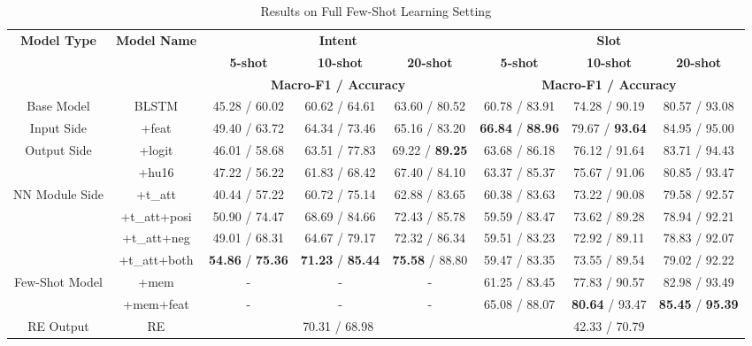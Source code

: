 \begin{table*}
{\begin{tabular}{|c|c|c|c|c|c|c|c|}
\hline
\multirow{3}{*}{\textbf{Model Type}} & \multirow{3}{*}{\textbf{Model Name}}  & \multicolumn{3}{|c|}{\textbf{Intent}} & \multicolumn{3}{|c|}{\textbf{Slot}} \\
\cline{3-8}
&  & \multicolumn{1}{|c|}{\textbf{5-shot}} & \multicolumn{1}{|c|}{\textbf{10-shot}} & \multicolumn{1}{|c|}{\textbf{20-shot}} 
& \multicolumn{1}{|c|}{\textbf{5-shot}} & \multicolumn{1}{|c|}{\textbf{10-shot}} & \multicolumn{1}{|c|}{\textbf{20-shot}}  \\
\cline{3-8}
&  & \multicolumn{3}{|c|}{\textbf{Macro-F1 / Accuracy}} & \multicolumn{3}{|c|}{\textbf{Macro-F1 / Accuracy}} \\
\hline
Base Model & BLSTM & 45.28 / 60.02 & 60.62 / 64.61 & 63.60 / 80.52 
& 60.78 / 83.91 & 74.28  / 90.19 & 80.57 / 93.08  \\
\hline
Input Side & +feat & 49.40 / 63.72 & 64.34 / 73.46 & 65.16 / 83.20 
& \textbf{66.84} / \textbf{88.96} & 79.67 / \textbf{93.64} & 84.95 / 95.00  \\
\hline
\multirow{2}{*}{Output Side} & +logit & 46.01 / 58.68 & 63.51 / 77.83 & 69.22 / \textbf{89.25} 
& 63.68 / 86.18 & 76.12 / 91.64  & 83.71 / 94.43 \\
\cline{2-8}
& +hu16 & 47.22 / 56.22 & 61.83 / 68.42 & 67.40 / 84.10 
& 63.37 / 85.37 & 75.67 / 91.06 & 80.85 / 93.47  \\
\hline
\multirow{2}{*}{\vspace{-2.2em}NN Module Side} & +t\_att & 40.44 / 57.22 & 60.72 / 75.14 & 62.88 / 83.65
& 60.38 / 83.63 & 73.22 / 90.08 & 79.58 / 92.57  \\
\cline{2-8}
& +t\_att+posi & 50.90 / 74.47 & 68.69 / 84.66 & 72.43 / 85.78 
& 59.59 / 83.47 & 73.62 / 89.28 & 78.94 / 92.21 \\
\cline{2-8}
& +t\_att+neg & 49.01 / 68.31 & 64.67 / 79.17 & 72.32 / 86.34 
& 59.51 / 83.23 & 72.92 / 89.11 & 78.83 / 92.07 \\
\cline{2-8}
& +t\_att+both & \textbf{54.86} / \textbf{75.36} & \textbf{71.23} / \textbf{85.44} & \textbf{75.58} / 88.80 
& 59.47 / 83.35 & 73.55 / 89.54 & 79.02 / 92.22 \\
\hline
\multirow{2}{*}{Few-Shot Model} & +mem & - & - & - & 61.25 / 83.45 & 77.83 / 90.57 & 82.98 / 93.49 \\
\cline{2-8}
& +mem+feat & - & - & - & 65.08 / 88.07 & \textbf{80.64} / 93.47 & \textbf{85.45} / \textbf{95.39} \\
\hline
\hline
RE Output & RE & \multicolumn{3}{|c|}{70.31 / 68.98} & \multicolumn{3}{|c|}{42.33 / 70.79} \\
\hline
\end{tabular}
}
\caption{Results on Full Few-Shot Learning Setting}
\label{tab_full_few}
\end{table*}

